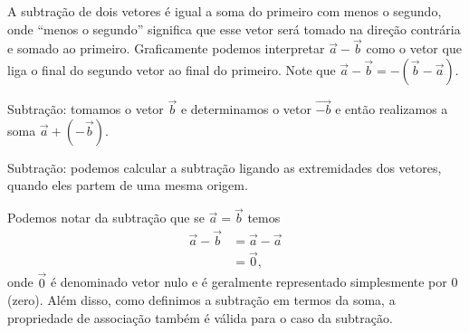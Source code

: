 A subtração de dois vetores é igual a soma do primeiro com menos o segundo, onde ``menos o segundo'' significa que esse vetor será tomado na direção contrária e somado ao primeiro. Graficamente podemos interpretar $\vec{a} - \vec{b}$ como o vetor que liga o final do segundo vetor ao final do primeiro. Note que $\vec{a} - \vec{b} = -(\vec{b}-\vec{a})$.
\begin{marginfigure}
\centering
{}
\caption{Subtração: tomamos o vetor $\vec{b}$ e determinamos o vetor $\vec{-b}$ e então realizamos a soma $\vec{a} + (-\vec{b})$.}
\end{marginfigure}
%
\begin{marginfigure}
\centering
{}
\caption{Subtração: podemos calcular a subtração ligando as extremidades dos vetores, quando eles partem de uma mesma origem.\label{Fig:Macete_subtracao}}
\end{marginfigure}
%
Podemos notar da subtração que se $\vec{a} = \vec{b}$ temos
\begin{align}
  \vec{a} - \vec{b} & = \vec{a} - \vec{a} \\
  &= \vec{0},
\end{align}
%
onde $\vec{0}$ é denominado vetor nulo e é geralmente representado simplesmente por 0 (zero).
Além disso, como definimos a subtração em termos da soma, a propriedade de associação também é válida para o caso da subtração.

